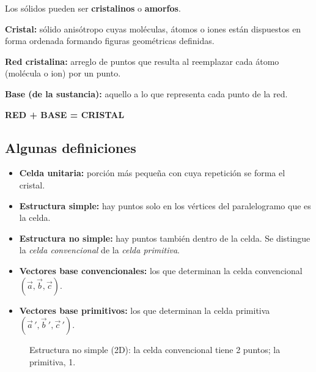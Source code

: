 \documentclass[11pt,a4paper]{article}
\begin{document}
Los sólidos pueden ser \textbf{cristalinos} o \textbf{amorfos}.

\textbf{Cristal:} sólido anisótropo cuyas moléculas, átomos o iones están dispuestos en forma ordenada formando figuras
geométricas definidas.

\textbf{Red cristalina:} arreglo de puntos que resulta al reemplazar cada átomo (molécula o ion) por un punto.

\textbf{Base (de la sustancia):} aquello a lo que representa cada punto de la red.

\begin{center}
\textbf{RED + BASE = CRISTAL}
\end{center}

\subsection{Algunas definiciones}
\begin{itemize}
  \item \textbf{Celda unitaria:} porción más pequeña con cuya repetición se forma el cristal.
  \item \textbf{Estructura simple:} hay puntos solo en los vértices del paralelogramo que es la celda.
  \item \textbf{Estructura no simple:} hay puntos también dentro de la celda. Se distingue la \emph{celda convencional} de la
        \emph{celda primitiva}.
  \item \textbf{Vectores base convencionales:} los que determinan la celda convencional $(\vec a,\vec b,\vec c)$.
  \item \textbf{Vectores base primitivos:} los que determinan la celda primitiva $(\vec a\,',\vec b\,',\vec c\,')$.
\end{itemize}

\begin{figure}[H]
\centering
{}
\caption{Estructura no simple (2D): la celda convencional tiene 2 puntos; la primitiva, 1.}
\end{figure}
\end{document}
